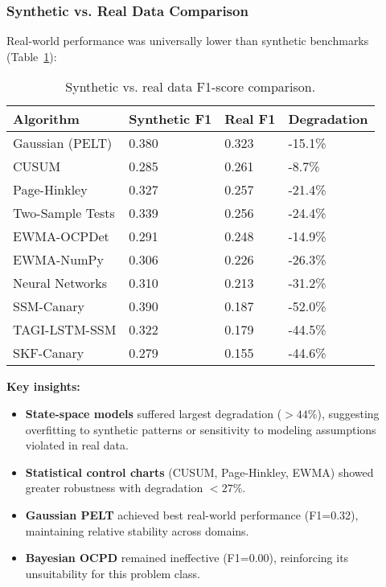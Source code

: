 \subsubsection{Synthetic vs. Real Data Comparison}

Real-world performance was universally lower than synthetic benchmarks (Table~\ref{tab:synthetic_vs_real}):

\begin{table}[H]
\caption{Synthetic vs. real data F1-score comparison.\label{tab:synthetic_vs_real}}
\begin{tabularx}{\textwidth}{lXXX}
\toprule
\textbf{Algorithm} & \textbf{Synthetic F1} & \textbf{Real F1} & \textbf{Degradation} \\
\midrule
Gaussian (PELT) & 0.380 & 0.323 & -15.1\% \\
CUSUM & 0.285 & 0.261 & -8.7\% \\
Page-Hinkley & 0.327 & 0.257 & -21.4\% \\
Two-Sample Tests & 0.339 & 0.256 & -24.4\% \\
EWMA-OCPDet & 0.291 & 0.248 & -14.9\% \\
EWMA-NumPy & 0.306 & 0.226 & -26.3\% \\
Neural Networks & 0.310 & 0.213 & -31.2\% \\
SSM-Canary & 0.390 & 0.187 & -52.0\% \\
TAGI-LSTM-SSM & 0.322 & 0.179 & -44.5\% \\
SKF-Canary & 0.279 & 0.155 & -44.6\% \\
\bottomrule
\end{tabularx}
\end{table}

\textbf{Key insights:}
\begin{itemize}
    \item \textbf{State-space models} suffered largest degradation ($>44\%$), suggesting overfitting to synthetic patterns or sensitivity to modeling assumptions violated in real data.
    \item \textbf{Statistical control charts} (CUSUM, Page-Hinkley, EWMA) showed greater robustness with degradation $<27\%$.
    \item \textbf{Gaussian PELT} achieved best real-world performance (F1=0.32), maintaining relative stability across domains.
    \item \textbf{Bayesian OCPD} remained ineffective (F1=0.00), reinforcing its unsuitability for this problem class.
\end{itemize}

